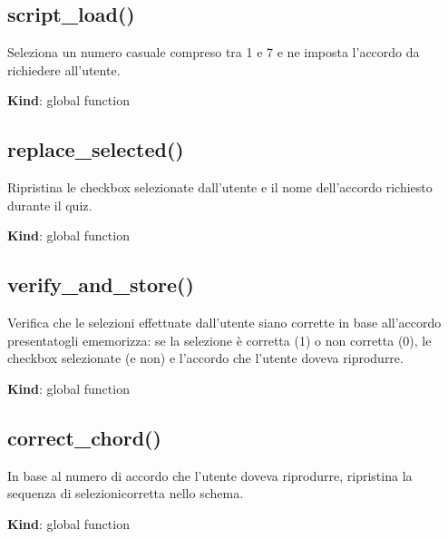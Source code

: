 \protect\hypertarget{script_load}{}{}

\hypertarget{script_load}{%
\subsection{script\_load()}\label{script_load}}

Seleziona un numero casuale compreso tra 1 e 7 e ne imposta l'accordo da
richiedere all'utente.

\textbf{Kind}: global function\\
\protect\hypertarget{replace_selected}{}{}

\hypertarget{replace_selected}{%
\subsection{replace\_selected()}\label{replace_selected}}

Ripristina le checkbox selezionate dall'utente e il nome dell'accordo
richiesto durante il quiz.

\textbf{Kind}: global function\\
\protect\hypertarget{verify_and_store}{}{}

\hypertarget{verify_and_store}{%
\subsection{verify\_and\_store()}\label{verify_and_store}}

Verifica che le selezioni effettuate dall'utente siano corrette in base
all'accordo presentatogli ememorizza: se la selezione è corretta (1) o
non corretta (0), le checkbox selezionate (e non) e l'accordo che
l'utente doveva riprodurre.

\textbf{Kind}: global function\\
\protect\hypertarget{correct_chord}{}{}

\hypertarget{correct_chord}{%
\subsection{correct\_chord()}\label{correct_chord}}

In base al numero di accordo che l'utente doveva riprodurre, ripristina
la sequenza di selezionicorretta nello schema.

\textbf{Kind}: global function
